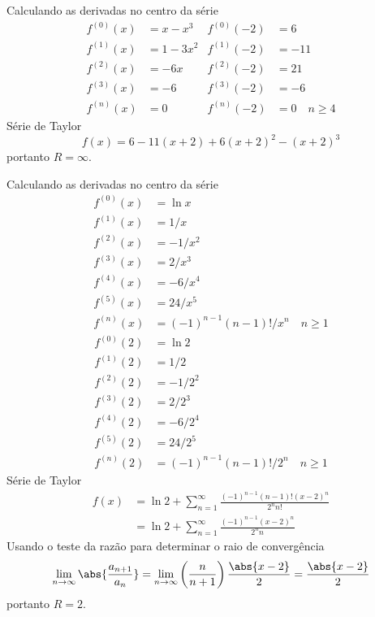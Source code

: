 \begin{exercises}
\begin{exercise}
\begin{answer}
\begin{alphalist}
  \item Calculando as derivadas no centro da série
  \begin{align*}
  	f^{(0)}(x) & = x - x^3 & f^{(0)}(-2) & = 6                \\
  	f^{(1)}(x) & = 1 -3x^2 & f^{(1)}(-2) & = -11              \\
  	f^{(2)}(x) & = -6x     & f^{(2)}(-2) & = 21               \\
  	f^{(3)}(x) & = -6      & f^{(3)}(-2) & = -6               \\
  	f^{(n)}(x) & = 0       & f^{(n)}(-2) & = 0 \quad n \geq 4
  \end{align*}
  Série de Taylor
  \[ f(x) = 6 - 11(x+2) + 6(x+2)^2 -(x+2)^3 \]
  portanto $R=\infty$.

  \item Calculando as derivadas no centro da série
  \begin{align*}
  	f^{(0)}(x) & = \ln x                \\
  	f^{(1)}(x) & =  1/x                 \\
  	f^{(2)}(x) & = -1/x^2               \\
  	f^{(3)}(x) & =  2/x^3               \\
  	f^{(4)}(x) & = -6/x^4               \\
  	f^{(5)}(x) & = 24/x^5               \\
  	f^{(n)}(x) & = (-1)^{n-1}(n-1)!/x^n \quad n \geq 1
  \end{align*}
  \begin{align*}
  	f^{(0)}(2) & = \ln 2                               \\
  	f^{(1)}(2) & = 1/2                                 \\
  	f^{(2)}(2) & = -1/2^2                              \\
  	f^{(3)}(2) & = 2/2^3                               \\
  	f^{(4)}(2) & = -6/2^4                              \\
  	f^{(5)}(2) & = 24/2^5                              \\
  	f^{(n)}(2) & = (-1)^{n-1}(n-1)!/2^n \quad n \geq 1
  \end{align*}
  Série de Taylor
  \begin{align*}
    f(x) & = \ln 2 + \sum_{n=1}^\infty \frac{(-1)^{n-1}(n-1)!(x-2)^n}{2^n n!} \\
         & = \ln 2 + \sum_{n=1}^\infty \frac{(-1)^{n-1}(x-2)^n}{2^n n}
  \end{align*}
  Usando o teste da razão para determinar o raio de convergência
  \[
    \lim_{n\to\infty}\abs{\frac{a_{n+1}}{a_n}} =
    \lim_{n\to\infty}\left( \frac{n}{n+1} \right)\frac{\abs{x-2}}{2} =
    \frac{\abs{x-2}}{2}
  \]
  portanto $R=2$.


\end{alphalist}
\end{answer}
\end{exercise}
\end{exercises}
